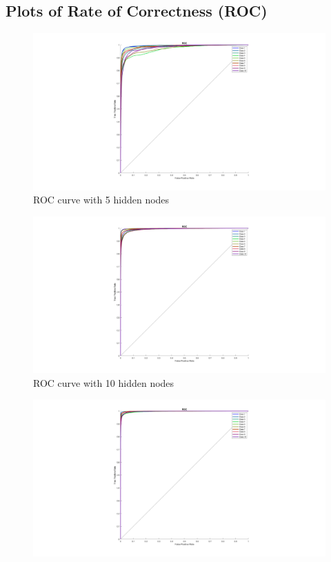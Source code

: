 \documentclass{article}
\begin{document}
{    \subsection*{Plots of Rate of Correctness (ROC)}
    {
        \begin{figure}[H]
            \centering
            \includegraphics[width = 1.0\linewidth]{src1/ROC_5.png}
            \caption{ROC curve with 5 hidden nodes}
        \end{figure}
        \begin{figure}[H]
            \centering
            \includegraphics[width = 1.0\linewidth]{src1/ROC_10.png}
            \caption{ROC curve with 10 hidden nodes}
        \end{figure}
        \begin{figure}[H]
            \centering
            \includegraphics[width = 1.0\linewidth]{src1/ROC_20.png}

\end{figure}}}
\end{document}
